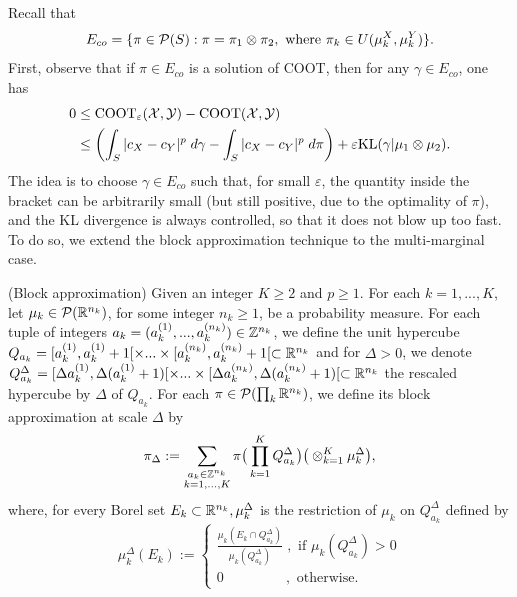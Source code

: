 Recall that
\begin{equation}
  E_{co} = \{ \pi \in \mathcal P(S): \pi = \pi_1 \otimes \pi_2,
  \text{ where } \pi_k \in U(\mu_k^X, \mu_k^Y) \}.
\end{equation}
First, observe that if $\pi \in E_{co}$ is a solution of COOT, then for any $\gamma \in E_{co}$, one has
\begin{equation}
  \begin{split}
    0 &\leq \text{COOT}_{\varepsilon}(\mathcal X, \mathcal Y) - \text{COOT}(\mathcal X, \mathcal Y) \\
    &\leq \left( \int_{S} \vert c_X - c_Y \vert^p \; d\gamma - \int_{S} \vert c_X - c_Y \vert^p \; d\pi \right) +
    \varepsilon \text{KL}(\gamma \vert \mu_1 \otimes \mu_2).
  \end{split}
\end{equation}
The idea is to choose $\gamma \in E_{co}$ such that, for small $\varepsilon$, the quantity inside the bracket can be arbitrarily small
(but still positive, due to the optimality of $\pi$), and the KL divergence is always controlled, so that it does not blow up too fast.
To do so, we extend the block approximation technique \citep{Carlier17} to the multi-marginal case.
\begin{definition}
  (Block approximation) Given an integer $K \geq 2$ and $p \geq 1$. For each $k=1,...,K$,
  let $\mu_k \in \mathcal P(\mathbb R^{n_k})$, for some integer $n_k \geq 1$, be a probability measure.
  For each tuple of integers $a_k = (a_k^{(1)}, ...,a_k^{(n_k)}) \in \mathbb Z^{n_k}$, we define the unit hypercube
  $Q_{a_k} = [a_k^{(1)}, a_k^{(1)} + 1[ \times ... \times [a_k^{(n_k)}, a_k^{(n_k)} + 1[ \subset \mathbb R^{n_k}$ and for $\Delta > 0$,
  we denote $Q^{\Delta}_{a_k} = [\Delta a_k^{(1)}, \Delta(a_k^{(1)} + 1)[ \times ... \times [\Delta a_k^{(n_k)}, \Delta(a_k^{(n_k)} + 1)[ \subset \mathbb R^{n_k}$ the rescaled hypercube by $\Delta$ of $Q_{a_k}$.
  For each $\pi \in \mathcal P(\prod_k \mathbb R^{n_k})$, we define its block approximation at scale $\Delta$ by
  \begin{equation}
    \pi_{\Delta} := \sum_{\substack{a_k \in \mathbb Z^{n_k} \\ k = 1, ..., K}}
    \pi \big(\prod_{k=1}^K Q^{\Delta}_{a_k}\big) \big( \otimes_{k=1}^K \mu_k^{\Delta} \big),
  \end{equation}
  where, for every Borel set $E_k \subset \mathbb R^{n_k}, \mu_k^{\Delta}$ is the restriction of $\mu_k$ on $Q^{\Delta}_{a_k}$ defined by
  \begin{equation}
    \mu_k^{\Delta}(E_k):=
    \begin{cases}
      \frac{\mu_k(E_k \cap Q^{\Delta}_{a_k})}{\mu_k(Q^{\Delta}_{a_k})} \; ,\text{ if } \mu_k(Q^{\Delta}_{a_k}) > 0 \\
      0 \;\;\;\;\;\;\;\;\;\;\;\;\;\;\;\;,\text{ otherwise}.
    \end{cases}
  \end{equation}
\end{definition}
